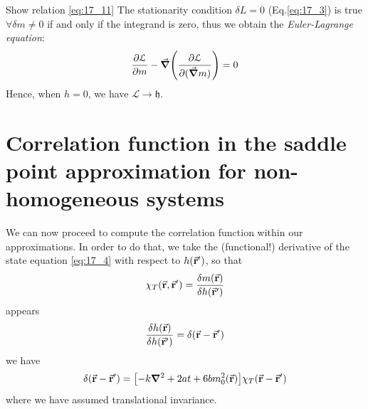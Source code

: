 \documentclass[../main/main.tex]{subfiles}
\begin{document}
\begin{example}{Show relation \eqref{eq:17_11}}{}
  The stationarity condition \( \delta L = 0 \) (Eq.\eqref{eq:17_3}) is true \( \forall \delta m \neq 0 \) if and only if the integrand is zero, thus we obtain the \emph{Euler-Lagrange equation}:
  \begin{equation*}
    \pdv{\mathcal{L}}{m} - \va{\grad } \qty(\pdv{\mathcal{L}}{(\va{\grad } m)} ) = 0
  \end{equation*}
  Hence, when \( h=0 \), we have \( \mathcal{L} \rightarrow  \mathfrak{h} \).

\end{example}





\section{Correlation function in the saddle point approximation for non-homogeneous systems}
We can now proceed to compute the correlation function within our approximations. In order to do that, we take the (functional!) derivative of the state equation \eqref{eq:17_4} with respect to \( h (\va{r}') \), so that
\begin{equation}
  \chi _T (\va{r},\va{r}') = \frac{\delta m(\va{r})}{\delta h (\va{r}')}
\end{equation}
appears
\begin{equation}
  \frac{\delta h (\va{r})}{\delta h (\va{r}')} = \delta (\va{r}-\va{r}')
\end{equation}
we have
\begin{equation}
  \delta  (\va{r} - \va{r}')  = \qty[- k \grad ^2 + 2 a t    + 6 b m_0^2 (\va{r}) ] \chi _T (\va{r}-\va{r}')
\end{equation}
where we have assumed translational invariance.
\end{document}
